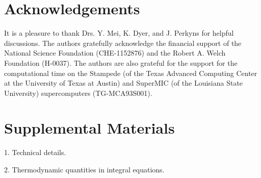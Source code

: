 \documentclass[aip,jcp,preprint,superscriptaddress,showpacs,preprintnumbers,amsmath,amssymb]{revtex4-1}
\begin{document}
\section{Acknowledgements}





It is a pleasure to thank Drs. Y. Mei, K. Dyer, and J. Perkyns
for helpful discussions.
%
The authors gratefully acknowledge the financial support
of the National Science Foundation (CHE-1152876)
and the Robert A. Welch Foundation (H-0037).
%
The authors are also grateful for the support
for the computational time on the Stampede
(of the Texas Advanced Computing Center
at the University of Texas at Austin)\cite{stampede}
and SuperMIC
(of the Louisiana State University)\cite{supermic}
supercomputers (TG-MCA93S001).





\section{Supplemental Materials}


1. Technical details.

2. Thermodynamic quantities in integral equations.






\end{document}
